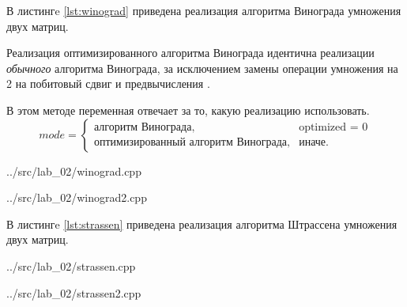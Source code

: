 В листингe \ref{lst:winograd} приведена реализация алгоритма Винограда умножения двух матриц.

Реализация оптимизированного алгоритма Винограда идентична реализации \textit{обычного} алгоритма Винограда, за исключением замены операции умножения на 2 на побитовый сдвиг и предвычисления .

В этом методе переменная  отвечает за то, какую реализацию использовать.
\begin{equation}
	\label{for:opt}
	mode =
	\begin{cases}
		\text{алгоритм Винограда}, & \text{optimized = 0}\\
		\text{оптимизированный алгоритм Винограда}, & \text{иначе.}
	\end{cases}
\end{equation}

\newpage

\begin{lstinputlisting}[
	label={lst:winograd},
	caption={Алгоритм Винограда},
	]{../src/lab_02/winograd.cpp}
\end{lstinputlisting}

\newpage 

\begin{lstinputlisting}[
	label={lst:winograd2},
	caption={продолжение листинга \ref{lst:winograd}},
	]{../src/lab_02/winograd2.cpp}
\end{lstinputlisting}

\newpage

В листингe \ref{lst:strassen} приведена реализация алгоритма Штрассена умножения двух матриц.

\begin{lstinputlisting}[
	label={lst:strassen},
	caption={Алгоритм Штрассена},
	]{../src/lab_02/strassen.cpp}
\end{lstinputlisting}

\newpage

\begin{lstinputlisting}[
	label={lst:strassen2},
	caption={продолжение листинга \ref{lst:strassen}},
	]{../src/lab_02/strassen2.cpp}
\end{lstinputlisting}